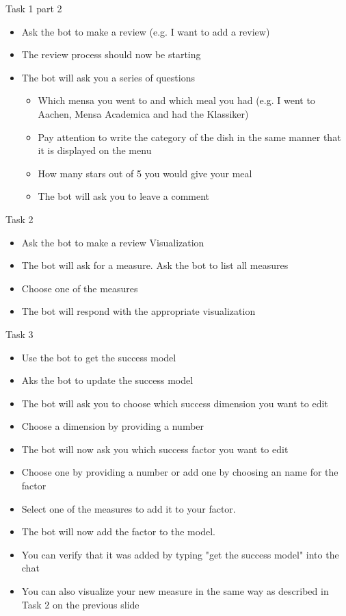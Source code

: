\begin{frame}{Task 1 part 2}
  \begin{itemize}
    \item Ask the bot to make a review (e.g. I want to add a review)
    \item The review process should now be starting 
    \item The bot will ask you a series of questions
    \begin{itemize}
      \item Which mensa you went to and which meal you had (e.g. I went to Aachen, Mensa Academica and had the Klassiker) 
      \item Pay attention to write the category of the dish in the same manner that it is displayed on the menu
      \item How many stars out of 5 you would give your meal
      \item The bot will ask you to leave a comment
    \end{itemize}
  \end{itemize}
\end{frame}

\begin{frame}{Task 2}
  \begin{itemize}
    \item Ask the bot to make a review Visualization
    \item The bot will ask for a measure. Ask the bot to list all measures
    \item Choose one of the measures 
    \item The bot will respond with the appropriate visualization
  \end{itemize}
\end{frame}

\begin{frame}{Task 3}
  \begin{itemize}
    \item Use the bot to get the success model
    \item Aks the bot to update the success model
    \item The bot will ask you to choose which success dimension you want to edit
    \item Choose a dimension by providing a number
    \item The bot will now ask you which success factor you want to edit
    \item Choose one by providing a number or add one by choosing an name for the factor
    \item Select one of the measures to add it to your factor. 
    \item The bot will now add the factor to the model.
    \item You can verify that it was added by typing "get the success model" into the chat
    \item You can also visualize your new measure in the same way as described in Task 2 on the previous slide
  \end{itemize}
\end{frame}

